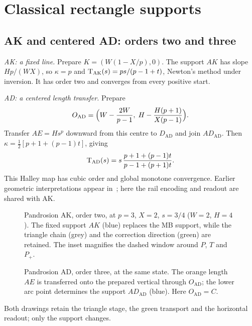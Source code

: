 \FloatBarrier
\appendix
\section{Classical rectangle supports}\label{app:classical}

\subsection{AK and centered AD: orders two and three}

\emph{AK: a fixed line.} Prepare $K=(W(1-X/p),0)$. The support $AK$ has slope $Hp/(WX)$, so
$\kappa=p$ and $\mathrm{T}_{\mathrm{AK}}(s)=ps/(p-1+t)$, Newton's method under inversion. It has order two and
converges from every positive start.

\emph{AD: a centered length transfer.} Prepare
\[ O_{\mathrm{AD}}=\Bigl(W-\frac{2W}{p-1},\;H-\frac{H(p+1)}{X(p-1)}\Bigr). \]
Transfer $AE=Hs^{p}$ downward from this centre to $D_{\mathrm{AD}}$ and join $AD_{\mathrm{AD}}$. Then
$\kappa=\tfrac12[p+1+(p-1)t]$, giving
\begin{equation}\label{eq:AD}
\mathrm{T}_{\mathrm{AD}}(s)=s\,\frac{p+1+(p-1)t}{p-1+(p+1)t}.
\end{equation}
This Halley map has cubic order and global monotone convergence. Earlier geometric interpretations
appear in~\cite{gander,scavo}; here the rail encoding and readout are shared with AK.

\begin{figure}[htbp]
\centering\figAK
\caption{Pandrosion AK, order two, at $p=3$, $X=2$, $s=3/4$ ($W=2$, $H=4$). The fixed support $AK$
(blue) replaces the MB support, while the triangle chain (grey) and the correction direction (green)
are retained. The inset magnifies the dashed window around $P$, $T$ and $P_+$.}\label{fig:ak}
\end{figure}

\begin{figure}[htbp]
\centering\figAD
\caption{Pandrosion AD, order three, at the same state. The orange length $AE$ is transferred onto the
prepared vertical through $O_{\mathrm{AD}}$; the lower arc point determines the support
$AD_{\mathrm{AD}}$ (blue). Here $O_{\mathrm{AD}}=C$.}\label{fig:ad}
\end{figure}

Both drawings retain the triangle stage, the green transport and the horizontal readout; only the
support changes.


